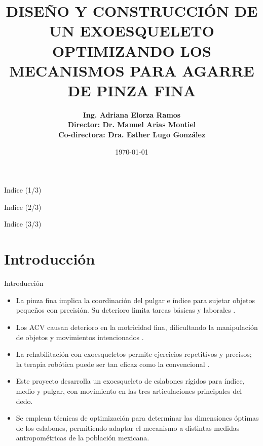 \documentclass[xcolor={table,dvipsnames}]{beamer}
\title{\large{DISE\~NO Y CONSTRUCCI\'ON DE UN EXOESQUELETO OPTIMIZANDO LOS MECANISMOS PARA AGARRE DE PINZA FINA}}
\author{
\textbf{Ing. Adriana Elorza Ramos} \\
\textbf{Director: Dr. Manuel Arias Montiel} \\
\textbf{Co-directora: Dra. Esther Lugo Gonz\'alez}
}
\date{\today}
\begin{document}
\begin{frame}[plain,t]
\titlepage
\end{frame}

\begin{frame}{Indice (1/3)}
\scriptsize
\tableofcontents[sections={1-4}]
\end{frame}

\begin{frame}{Indice (2/3)}
\scriptsize
\tableofcontents[sections={5-6}]
\end{frame}

\begin{frame}{Indice (3/3)}
\scriptsize
\tableofcontents[sections={7-9}]
\end{frame}

\section{Introducci\'on}

\begin{frame}{Introducci\'on}
    \small
    \begin{itemize}
        \item La pinza fina implica la coordinaci\'on del pulgar e \'indice para sujetar objetos peque\~nos con precisi\'on. Su deterioro limita tareas b\'asicas y laborales \cite{kim2017}.
        \item Los ACV causan deterioro en la motricidad fina, dificultando la manipulaci\'on de objetos y movimientos intencionados \cite{kim2017}.
        \item La rehabilitaci\'on con exoesqueletos permite ejercicios repetitivos y precisos; la terapia rob\'otica puede ser tan eficaz como la convencional \cite{ueki2012}\cite{Fukui2025}.
        \item Este proyecto desarrolla un exoesqueleto de eslabones r\'igidos para \'indice, medio y pulgar, con movimiento en las tres articulaciones principales del dedo.
        \item Se emplean t\'ecnicas de optimizaci\'on para determinar las dimensiones \'optimas de los eslabones, permitiendo adaptar el mecanismo a distintas medidas antropom\'etricas de la poblaci\'on mexicana.
    \end{itemize}
\end{frame}
\end{document}
